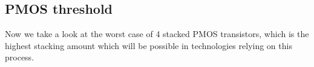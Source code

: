 \subsection{PMOS threshold}
Now we take a look at the worst case of 4 stacked PMOS transistors, which is the highest stacking amount which will be possible in technologies relying on this process.
